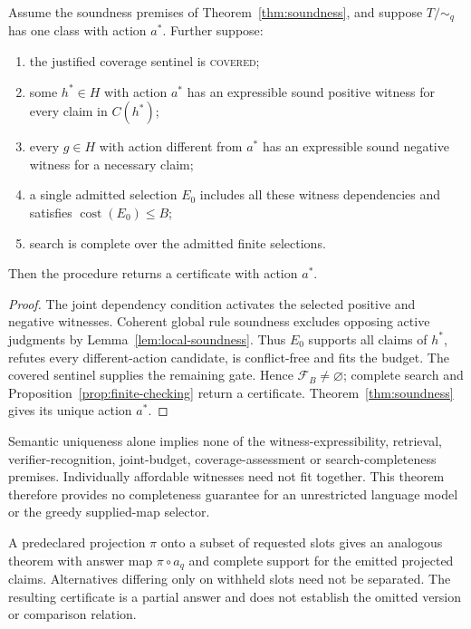 \begin{theorem}
\label{thm:complete}
Assume the soundness premises of Theorem~\ref{thm:soundness}, and suppose
$T/{\sim_q}$ has one class with action $a^*$. Further suppose:
\begin{enumerate}
 \item the justified coverage sentinel is \textnormal{\textsc{covered}};
 \item some $h^*\in H$ with action $a^*$ has an expressible sound positive
       witness for every claim in $C(h^*)$;
 \item every $g\in H$ with action different from $a^*$ has an expressible
       sound negative witness for a necessary claim;
 \item a single admitted selection $E_0$ includes all these witness
       dependencies and satisfies $\operatorname{cost}(E_0)\le B$;
 \item search is complete over the admitted finite selections.
\end{enumerate}
Then the procedure returns a certificate with action $a^*$.
\end{theorem}
\begin{proof}
The joint dependency condition activates the selected positive and negative
witnesses. Coherent global rule soundness excludes opposing active judgments
by Lemma~\ref{lem:local-soundness}. Thus $E_0$ supports all claims of $h^*$,
refutes every different-action candidate, is conflict-free and fits the
budget. The covered sentinel supplies the remaining gate. Hence
$\mathcal F_B\ne\varnothing$; complete search and
Proposition~\ref{prop:finite-checking} return a certificate.
Theorem~\ref{thm:soundness} gives its unique action $a^*$.
\end{proof}

Semantic uniqueness alone implies none of the witness-expressibility,
retrieval, verifier-recognition, joint-budget, coverage-assessment or
search-completeness premises. Individually affordable witnesses need not fit
together. This theorem therefore provides no completeness guarantee for an
unrestricted language model or the greedy supplied-map selector.

A predeclared projection $\pi$ onto a subset of requested slots gives an
analogous theorem with answer map $\pi\circ a_q$ and complete support for the
emitted projected claims. Alternatives differing only on withheld slots need
not be separated. The resulting certificate is a partial answer and does not
establish the omitted version or comparison relation.

